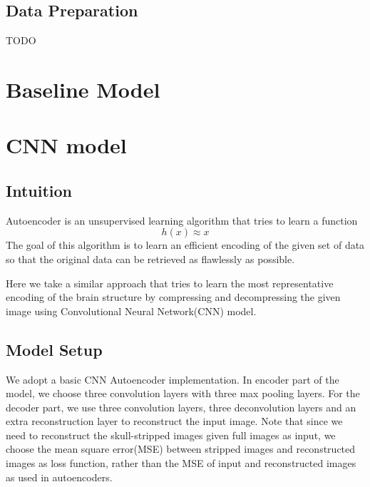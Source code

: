 \documentclass[conference]{IEEEtran}
\begin{document}
\subsection*{Data Preparation}
TODO

\section{Baseline Model}

\section{CNN model}
\subsection*{Intuition}
Autoencoder is an unsupervised learning algorithm that tries to learn a function
 \[ h(x) \approx x \]
 The goal of this algorithm is to learn an efficient encoding of the given set of data so that the original data can be retrieved as flawlessly as possible. 

Here we take a similar approach that tries to learn the most representative encoding of the brain structure by compressing and decompressing the given image using Convolutional Neural Network(CNN) model. 

\subsection*{Model Setup}
We adopt a basic CNN Autoencoder implementation. In encoder part of the model, we choose three convolution layers with three max pooling layers. For the decoder part, we use three convolution layers, three deconvolution layers and an extra reconstruction layer to reconstruct the input image. Note that since we need to reconstruct the skull-stripped images given full images as input, we choose the mean square error(MSE) between stripped images and reconstructed images as loss function, rather than the MSE of input and reconstructed images as used in autoencoders.
\end{document}
